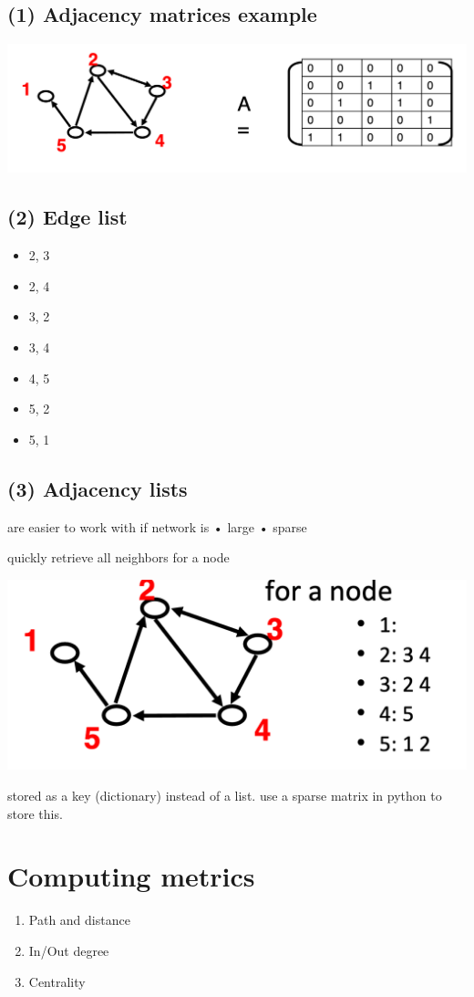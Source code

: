\documentclass[11pt]{article}
\theoremstyle{definition}
\begin{document}
\subsection{(1) Adjacency matrices example}
\includegraphics[width=\textwidth/2]{10.png}

\subsection{(2) Edge list}
\begin{itemize}
    \item 2, 3
    \item 2, 4
    \item 3, 2
    \item 3, 4
    \item 4, 5
    \item 5, 2
    \item 5, 1
\end{itemize}

\subsection{(3) Adjacency lists}
are easier to work with if
network is
• large
• sparse

quickly retrieve all neighbors
for a node

\includegraphics[width=\textwidth/2]{11.png}

stored as a key (dictionary) instead of a list. 
use a sparse matrix in python to store this.

\section{Computing metrics}
\begin{enumerate}
    \item Path and distance
    \item In/Out degree
    \item Centrality
\end{enumerate}
\end{document}
